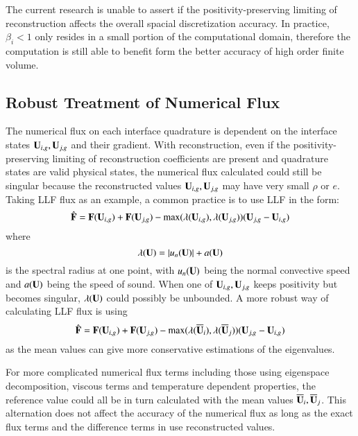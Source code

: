 \documentclass[preprint,12pt]{elsarticle}
\begin{document}
The current research is unable to assert if the positivity-preserving
limiting of reconstruction affects the overall spacial discretization accuracy.
In practice, $\beta_i < 1$ only resides in a small portion of 
the computational domain, therefore the computation is still able to benefit
form the better accuracy of high order finite volume.

\subsection{Robust Treatment of Numerical Flux}

The numerical flux on each interface 
quadrature is dependent on the interface 
states $\mathbf{U}_{i,g},\mathbf{U}_{j,g}$ and their gradient.
With reconstruction, even if the positivity-preserving
limiting of reconstruction coefficients are present and 
quadrature states are valid physical states, the 
numerical flux calculated could still be singular
because the reconstructed values $\mathbf{U}_{i,g},\mathbf{U}_{j,g}$
may have very small $\rho$ or $e$. 
Taking LLF flux as an example, a common practice is to use LLF in the form:
\begin{equation}
    \label{eq:LLFCommon}
    \hat{\mathbf{F}} = \mathbf{F}(\mathbf{U}_{i,g}) + \mathbf{F}(\mathbf{U}_{j,g}) - \max(\lambda(\mathbf{U}_{i,g}),\lambda(\mathbf{U}_{j,g}))(\mathbf{U}_{j,g}- \mathbf{U}_{i,g})
\end{equation}
where
\begin{equation}
    \lambda(\mathbf{U}) = |u_n(\mathbf{U})| + a(\mathbf{U})
\end{equation}
is the spectral radius at one point, with $u_n(\mathbf{U})$ being the normal convective speed 
and $a(\mathbf{U})$ being the speed of sound.
When one of $\mathbf{U}_{i,g},\mathbf{U}_{j,g}$ keeps positivity but becomes singular,
$\lambda(\mathbf{U})$ could possibly be unbounded.
A more robust way of calculating LLF flux is using 
\begin{equation}
    \hat{\mathbf{F}} = \mathbf{F}(\mathbf{U}_{i,g}) + \mathbf{F}(\mathbf{U}_{j,g}) - \max(\lambda(\overline{\mathbf{U}}_i),\lambda(\overline{\mathbf{U}}_j))(\mathbf{U}_{j,g}- \mathbf{U}_{i,g})
\end{equation}
as the mean values can give more conservative estimations of 
the eigenvalues.

For more complicated numerical flux terms including those 
using eigenspace decomposition, viscous terms 
and temperature dependent properties, 
the reference value could all be in turn calculated with the mean values $\overline{\mathbf{U}}_i, \overline{\mathbf{U}}_j$.
This alternation does not affect the accuracy of the numerical flux 
as long as the exact flux terms and the difference terms in  use 
reconstructed values.
\end{document}

